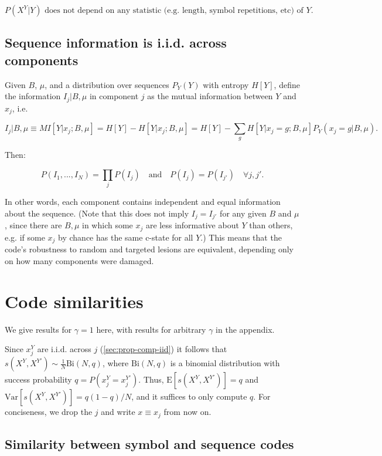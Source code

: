 \documentclass{article}
\begin{document}
$$P(X^Y|Y) \textrm{ does not depend on any statistic (e.g. length, symbol repetitions, etc) of } Y.$$

\subsection{Sequence information is i.i.d. across components}
\label{sec:prop-info-iid}

Given $B$, $\mu$, and a distribution over sequences $P_Y(Y)$ with entropy $H[Y]$, define the information $I_j | B, \mu$ in component $j$ as the mutual information between $Y$ and $x_j$, i.e.

$$I_j | B, \mu \equiv MI[Y|x_j; B, \mu] = H[Y] - H[Y|x_j; B, \mu] = H[Y] - \sum_g H[Y|x_j = g; B, \mu] P_Y(x_j = g| B, \mu).$$

Then:

$$P(I_1, ..., I_N) = \prod_j P(I_j) \quad \textrm{and} \quad P(I_j) = P(I_{j'}) \quad \forall j, j'.$$

In other words, each component contains independent and equal information about the sequence. (Note that this does not imply $I_j = I_{j'}$ for any given $B$ and $\mu$, since there are $B, \mu$ in which some $x_j$ are less informative about $Y$ than others, e.g. if some $x_j$ by chance has the same c-state for all $Y$.) This means that the code's robustness to random and targeted lesions are equivalent, depending only on how many components were damaged.

\section{Code similarities}

We give results for $\gamma = 1$ here, with results for arbitrary $\gamma$ in the appendix.

Since $x^Y_j$ are i.i.d. across $j$ (\ref{sec:prop-comp-iid}) it follows that $s(X^Y, X^{Y'}) \sim \frac{1}{N}\textrm{Bi}(N, q)$, where $\textrm{Bi}(N, q)$ is a binomial distribution with success probability $q = P(x^Y_j = x^{Y'}_j)$. Thus, $\textrm{E}[s(X^Y, X^{Y'})] = q$ and $\textrm{Var}[s(X^Y, X^{Y'})] = q(1-q)/N$, and it suffices to only compute $q$. For conciseness, we drop the $j$ and write $x \equiv x_j$ from now on. 

\subsection{Similarity between symbol and sequence codes}
\end{document}
